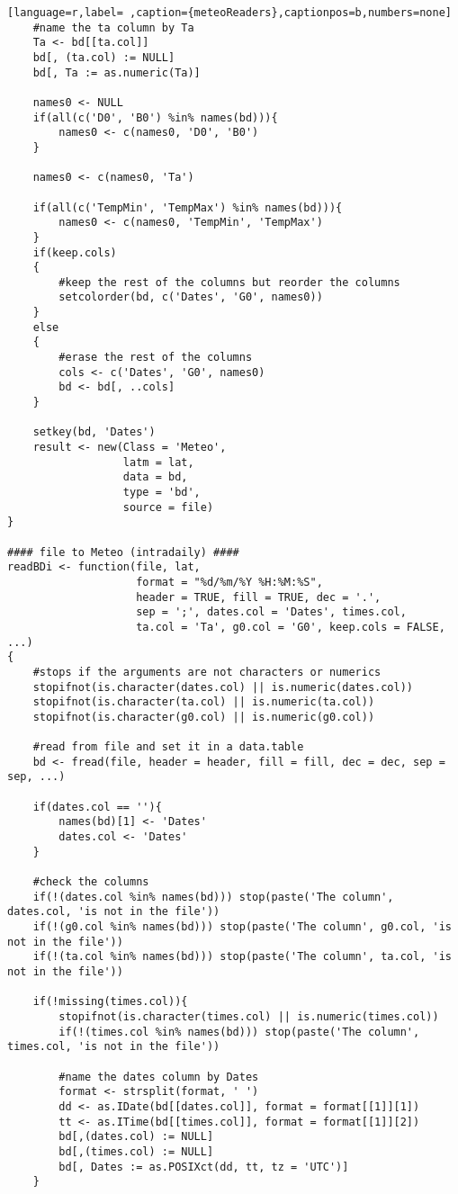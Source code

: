 \begin{lstlisting}[language=r,label= ,caption={meteoReaders},captionpos=b,numbers=none]
    #name the ta column by Ta
    Ta <- bd[[ta.col]]
    bd[, (ta.col) := NULL]
    bd[, Ta := as.numeric(Ta)]

    names0 <- NULL
    if(all(c('D0', 'B0') %in% names(bd))){
        names0 <- c(names0, 'D0', 'B0')
    }

    names0 <- c(names0, 'Ta')

    if(all(c('TempMin', 'TempMax') %in% names(bd))){
        names0 <- c(names0, 'TempMin', 'TempMax')
    }
    if(keep.cols)
    {
        #keep the rest of the columns but reorder the columns
        setcolorder(bd, c('Dates', 'G0', names0))
    }
    else
    {
        #erase the rest of the columns
        cols <- c('Dates', 'G0', names0)
        bd <- bd[, ..cols]
    }

    setkey(bd, 'Dates')
    result <- new(Class = 'Meteo',
                  latm = lat,
                  data = bd,
                  type = 'bd',
                  source = file)
}

#### file to Meteo (intradaily) ####
readBDi <- function(file, lat,
                    format = "%d/%m/%Y %H:%M:%S",
                    header = TRUE, fill = TRUE, dec = '.',
                    sep = ';', dates.col = 'Dates', times.col,
                    ta.col = 'Ta', g0.col = 'G0', keep.cols = FALSE, ...)
{
    #stops if the arguments are not characters or numerics
    stopifnot(is.character(dates.col) || is.numeric(dates.col))
    stopifnot(is.character(ta.col) || is.numeric(ta.col))
    stopifnot(is.character(g0.col) || is.numeric(g0.col))

    #read from file and set it in a data.table
    bd <- fread(file, header = header, fill = fill, dec = dec, sep = sep, ...)

    if(dates.col == ''){
        names(bd)[1] <- 'Dates'
        dates.col <- 'Dates'
    }

    #check the columns
    if(!(dates.col %in% names(bd))) stop(paste('The column', dates.col, 'is not in the file'))
    if(!(g0.col %in% names(bd))) stop(paste('The column', g0.col, 'is not in the file'))
    if(!(ta.col %in% names(bd))) stop(paste('The column', ta.col, 'is not in the file'))

    if(!missing(times.col)){
        stopifnot(is.character(times.col) || is.numeric(times.col))
        if(!(times.col %in% names(bd))) stop(paste('The column', times.col, 'is not in the file'))

        #name the dates column by Dates
        format <- strsplit(format, ' ')
        dd <- as.IDate(bd[[dates.col]], format = format[[1]][1])
        tt <- as.ITime(bd[[times.col]], format = format[[1]][2])
        bd[,(dates.col) := NULL]
        bd[,(times.col) := NULL]
        bd[, Dates := as.POSIXct(dd, tt, tz = 'UTC')]
    }


\end{lstlisting}
